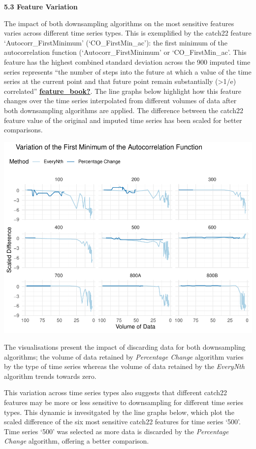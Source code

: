 \documentclass{article}
\begin{document}
\textbf{5.3 Feature Variation}

The impact of both downsampling algorithms on the most sensitive
features varies across different time series types. This is exemplified
by the catch22 feature `Autocorr\_FirstMinimum' (`CO\_FirstMin\_ac'):
the first minimum of the autocorrelation function
(`Autocorr\_FirstMinimum' or `CO\_FirstMin\_ac'. This feature has the
highest combined standard deviation across the 900 imputed time series
represents ``the number of steps into the future at which a value of the
time series at the current point and that future point remain
substantially (\textgreater1/e) correlated''
\protect\hyperlink{ref-feature_book}{\textbf{feature\_book?}}. The line
graphs below highlight how this feature changes over the time series
interpolated from different volumes of data after both downsampling
algorithms are applied. The difference between the catch22 feature value
of the original and imputed time series has been scaled for better
comparisons.

\includegraphics{210431461_CSC8639_Dissertation_files/figure-latex/FirstMinimum-1.pdf}

The visualisations present the impact of discarding data for both
downsampling algorithms; the volume of data retained by \emph{Percentage
Change} algorithm varies by the type of time series whereas the volume
of data retained by the \emph{EveryNth} algorithm trends towards zero.

This variation across time series types also suggests that different
catch22 features may be more or less sensitive to downsampling for
different time series types. This dynamic is invesitgated by the line
graphs below, which plot the scaled difference of the six most sensitive
catch22 features for time series `500'. Time series `500' was selected
as more data is discarded by the \emph{Percentage Change} algorithm,
offering a better comparison.
\end{document}
